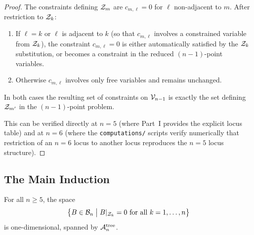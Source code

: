 \begin{proof}
The constraints defining $\mathcal{Z}_m$ are $c_{m,\ell} = 0$ for
$\ell$ non-adjacent to $m$. After restriction to $\mathcal{Z}_k$:
\begin{enumerate}[label=(\roman*)]
  \item If $\ell = k$ or $\ell$ is adjacent to $k$ (so that
    $c_{m,\ell}$ involves a constrained variable from $\mathcal{Z}_k$),
    the constraint $c_{m,\ell} = 0$ is either automatically
    satisfied by the $\mathcal{Z}_k$ substitution, or becomes a
    constraint in the reduced $(n-1)$-point variables.
  \item Otherwise $c_{m,\ell}$ involves only free variables
    and remains unchanged.
\end{enumerate}
In both cases the resulting set of constraints on $\mathcal{V}_{n-1}$
is exactly the set defining $\mathcal{Z}_{m'}$ in the $(n-1)$-point
problem.

This can be verified directly at $n=5$ (where Part~I provides
the explicit locus table) and at $n=6$ (where the
\texttt{computations/} scripts verify numerically that
restriction of an $n=6$ locus to another locus reproduces
the $n=5$ locus structure).
\end{proof}

\subsection{The Main Induction}
\label{ssec:induction}

\begin{theorem}
\label{thm:main}
For all $n \geq 5$, the space
\[
  \bigl\{ B \in \mathcal{B}_n \;\big|\; B|_{\mathcal{Z}_k} = 0
  \text{ for all } k = 1, \ldots, n \bigr\}
\]
is one-dimensional, spanned by $\mathcal{A}_n^{\mathrm{tree}}$.
\end{theorem}

